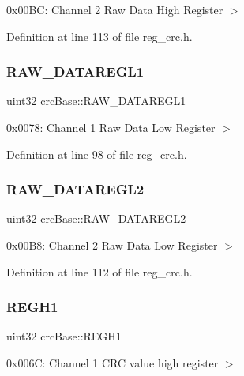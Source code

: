 0x00\+BC\+: Channel 2 Raw Data High Register $>$ 

Definition at line 113 of file reg\+\_\+crc.\+h.

\mbox{\label{structcrcBase_a11ad3ee22efd150b755b414780f69bf8}} 
\subsubsection{\texorpdfstring{R\+A\+W\+\_\+\+D\+A\+T\+A\+R\+E\+G\+L1}{RAW\_DATAREGL1}}
{\footnotesize\ttfamily uint32 crc\+Base\+::\+R\+A\+W\+\_\+\+D\+A\+T\+A\+R\+E\+G\+L1}

0x0078\+: Channel 1 Raw Data Low Register $>$ 

Definition at line 98 of file reg\+\_\+crc.\+h.

\mbox{\label{structcrcBase_aac8f543cb80c123d27f585c0bd218619}} 
\subsubsection{\texorpdfstring{R\+A\+W\+\_\+\+D\+A\+T\+A\+R\+E\+G\+L2}{RAW\_DATAREGL2}}
{\footnotesize\ttfamily uint32 crc\+Base\+::\+R\+A\+W\+\_\+\+D\+A\+T\+A\+R\+E\+G\+L2}

0x00\+B8\+: Channel 2 Raw Data Low Register $>$ 

Definition at line 112 of file reg\+\_\+crc.\+h.

\mbox{\label{structcrcBase_a2ef4e1210222c3e4a28743154fe061cc}} 
\subsubsection{\texorpdfstring{R\+E\+G\+H1}{REGH1}}
{\footnotesize\ttfamily uint32 crc\+Base\+::\+R\+E\+G\+H1}

0x006C\+: Channel 1 C\+RC value high register $>$ 


